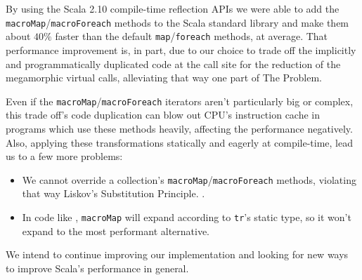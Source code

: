\label{conclusions}

By using the Scala 2.10 compile-time reflection APIs we were able to add the \texttt{macroMap}/\texttt{macroForeach} methods to the Scala standard library and make them about $40\%$ faster than the default \texttt{map}/\texttt{foreach} methods, at average. That performance improvement is, in part, due to our choice to trade off the implicitly and programmatically duplicated code at the call site for the reduction of the megamorphic virtual calls, alleviating that way one part of The Problem.

Even if the \texttt{macroMap}/\texttt{macroForeach} iterators aren't particularly big or complex, this trade off's code duplication can blow out CPU's instruction cache in programs which use these methods heavily, affecting the performance negatively. Also, applying these transformations statically and eagerly at compile-time, lead us to a few more problems:

\begin{itemize}
 \item We cannot override a collection's \texttt{macroMap}/\texttt{macroForeach} methods, violating that way Liskov's Substitution Principle. .
 \item In code like , \texttt{macroMap} will expand according to \texttt{tr}'s static type, so it won't expand to the most performant alternative.
\end{itemize}

We intend to continue improving our implementation and looking for new ways to improve Scala's performance in general.